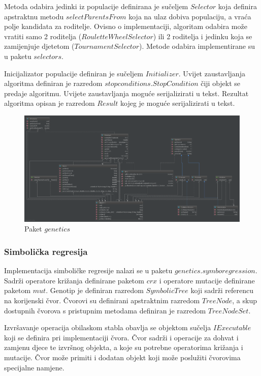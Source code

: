 \documentclass[times, utf8, numeric, diplomski]{fer}
\begin{document}
Metoda odabira jedinki iz populacije definirana je sučeljem $Selector$ koja definira apstraktnu metodu $selectParentsFrom$ koja na ulaz dobiva populaciju, a vraća polje kandidata za roditelje. Ovisno o implementaciji, algoritam odabira može vratiti samo 2 roditelja ($RouletteWheelSelector$) ili 2 roditelja i jedinku koja se zamijenjuje djetetom ($TournamentSelector$). Metode odabira implementirane su u paketu $selectors$.

Inicijalizator populacije definiran je sučeljem $Initializer$. Uvijet zaustavljanja algoritma definiran je razredom $stopconditions.StopCondition$ čiji objekt se predaje algoritmu. Uvijete zaustavljanja moguće serijalizirati u tekst. Rezultat algoritma opisan je razredom $Result$ kojeg je moguće serijalizirati u tekst.

\begin{figure}[ht]
\includegraphics[width=\textwidth]{pkg_genetics.pdf}
\centering
\caption{Paket $genetics$}
\label{fig:pkg_genetics}
\end{figure}

\subsubsection{Simbolička regresija}
Implementacija simboličke regresije nalazi se u paketu $genetics.symboregression$. Sadrži operatore križanja definirane paketom $crx$ i operatore mutacije definirane paketom $mut$. Genotip je definiran razredom $SymbolicTree$ koji sadrži referencu na korijenski čvor. Čvorovi su definirani apstraktnim razredom $TreeNode$, a skup dostupnih čvorova s pristupnim metodama definiran je razredom $TreeNodeSet$.

Izvršavanje operacija obilaskom stabla obavlja se objektom sučelja $IExecutable$ koji se definira pri implementaciji čvora. Čvor sadrži i operacije za dohvat i zamjenu djece te izvršnog objekta, a koje su potrebne operatorima križanja i mutacije. Čvor može primiti i dodatan objekt koji može poslužiti čvorovima specijalne namjene.
\end{document}
